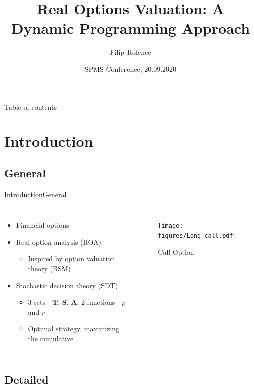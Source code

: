 \documentclass[us]{beamer}
\title{Real Options Valuation: A Dynamic Programming Approach}
\author{Filip Rolenec}
\institute[CTU-FNSPE] %
{
  \inst{}%
  Czech technical university in Prague\\
  FNSPE \\
  Department of Mathematics
 
}
\date{SPMS Conference, 20.09.2020}
\begin{document}
\begin{frame}
  \titlepage
\end{frame}

\begin{frame}{Table of contents}
  \tableofcontents
\end{frame}


\section{Introduction}

\subsection{General}

\begin{frame}{Introduction}{General}

	\begin{columns}
 		\begin{itemize}
 			\item {Financial options}
			\item {Real option analysis (ROA)}
			\begin{itemize}
				\item{Inspired by option valuation theory (BSM)} 
			\end{itemize}
			\item {Stochastic decision theory (SDT)}
			\begin{itemize}
				\item {3 sets - $\mathbf{T}$, $\mathbf{S}$, $\mathbf{A}$, 2 functions - $p$ and $r$}
				\item {Optimal strategy, maximizing the cumulative}
			\end{itemize}
		\end{itemize}	
		\begin{figure}
			\texttt{[image: figures/Long\_call.pdf]}
			\caption{Call Option \cite{Inv:20}}
		\end{figure}
\end{columns}	

\end{frame}

\subsection{Detailed}
\end{document}
